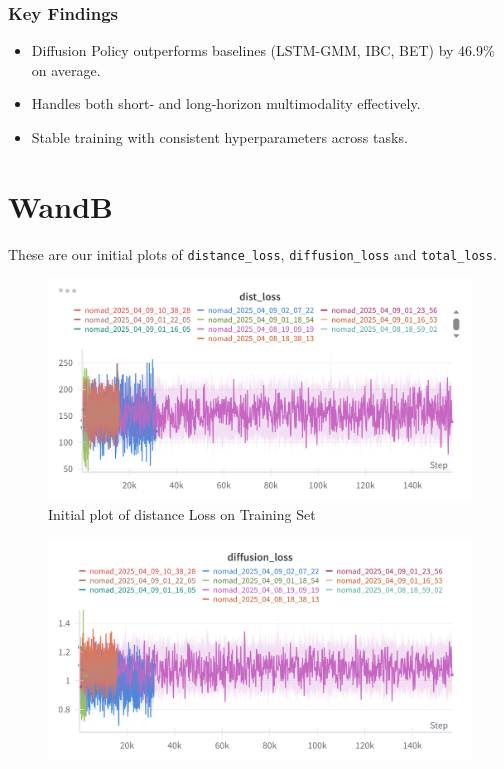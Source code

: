 \documentclass[12pt]{article}
\begin{document}
\begin{appendices}
\subsubsection*{Key Findings}
\begin{itemize}
    \item Diffusion Policy outperforms baselines (LSTM-GMM, IBC, BET) by 46.9\% on average.
    \item Handles both short- and long-horizon multimodality effectively.
    \item Stable training with consistent hyperparameters across tasks.
\end{itemize}
\newpage
\section{WandB}
\label{app:wandb}
These are our initial plots of \texttt{distance\_loss}, \texttt{diffusion\_loss} and \texttt{total\_loss}.
\begin{figure}[H]
    \centering
    \includegraphics[width=\textwidth]{images/old_dist_loss.png}
    \caption{Initial plot of distance Loss on Training Set}
    \label{fig:init_dist_loss}
\end{figure}
\begin{figure}[H]
    \centering
    \includegraphics[width=\textwidth]{images/diffloss.png}

\end{figure}
\end{appendices}
\end{document}
